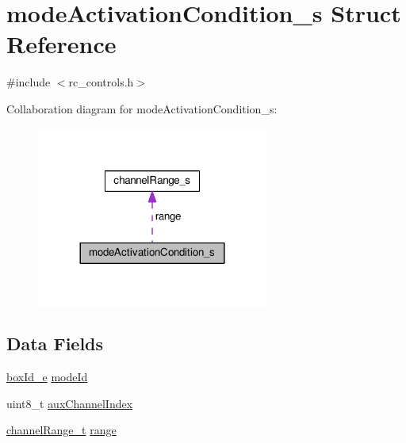 \hypertarget{structmodeActivationCondition__s}{\section{mode\+Activation\+Condition\+\_\+s Struct Reference}
\label{structmodeActivationCondition__s}
}


{\ttfamily \#include $<$rc\+\_\+controls.\+h$>$}



Collaboration diagram for mode\+Activation\+Condition\+\_\+s\+:\nopagebreak
\begin{figure}[H]
\begin{center}
\leavevmode
\includegraphics[width=216pt]{structmodeActivationCondition__s__coll__graph}
\end{center}
\end{figure}
\subsection*{Data Fields}
\begin{DoxyCompactItemize}
\item 
\hyperlink{rc__controls_8h_a204cb52657be464220db4dca1fcf9045}{box\+Id\+\_\+e} \hyperlink{structmodeActivationCondition__s_a328a6eef1426aae906042b91c9f5c561}{mode\+Id}
\item 
uint8\+\_\+t \hyperlink{structmodeActivationCondition__s_a2a0fe45d4472aa10276147f13a86b620}{aux\+Channel\+Index}
\item 
\hyperlink{rc__controls_8h_a828530b5a74a83442378d11970c97db1}{channel\+Range\+\_\+t} \hyperlink{structmodeActivationCondition__s_a9f5fc943f64e15a98e0886332b4db9da}{range}
\end{DoxyCompactItemize}


